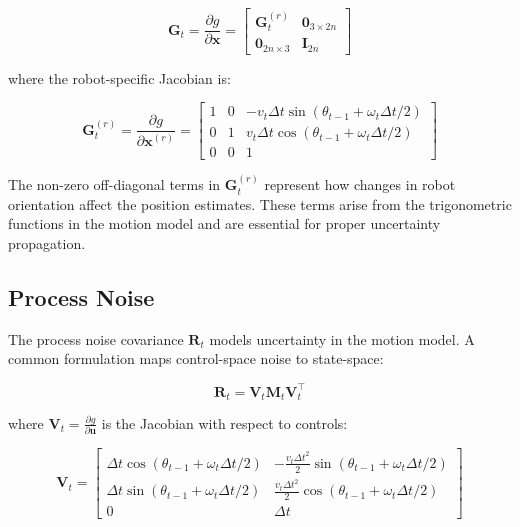 \documentclass[12pt,a4paper]{article}
\newcommand{\state}{\bm{x}}
\newcommand{\control}{\bm{u}}
\begin{document}
\begin{equation}
    \bm{G}_t = \frac{\partial g}{\partial \state} = \begin{bmatrix}
        \bm{G}_t^{(r)} & \bm{0}_{3 \times 2n} \\
        \bm{0}_{2n \times 3} & \bm{I}_{2n}
    \end{bmatrix}
\end{equation}

where the robot-specific Jacobian is:

\begin{equation}
    \bm{G}_t^{(r)} = \frac{\partial g}{\partial \state^{(r)}} = \begin{bmatrix}
        1 & 0 & -v_t \Delta t \sin(\theta_{t-1} + \omega_t \Delta t / 2) \\
        0 & 1 & v_t \Delta t \cos(\theta_{t-1} + \omega_t \Delta t / 2) \\
        0 & 0 & 1
    \end{bmatrix}
    \label{eq:motion_jacobian}
\end{equation}

The non-zero off-diagonal terms in $\bm{G}_t^{(r)}$ represent how changes in robot orientation affect the position estimates. These terms arise from the trigonometric functions in the motion model and are essential for proper uncertainty propagation.

\subsection{Process Noise}

The process noise covariance $\bm{R}_t$ models uncertainty in the motion model. A common formulation maps control-space noise to state-space:

\begin{equation}
    \bm{R}_t = \bm{V}_t \bm{M}_t \bm{V}_t^\top
\end{equation}

where $\bm{V}_t = \frac{\partial g}{\partial \control}$ is the Jacobian with respect to controls:

\begin{equation}
    \bm{V}_t = \begin{bmatrix}
        \Delta t \cos(\theta_{t-1} + \omega_t \Delta t / 2) & -\frac{v_t \Delta t^2}{2} \sin(\theta_{t-1} + \omega_t \Delta t / 2) \\
        \Delta t \sin(\theta_{t-1} + \omega_t \Delta t / 2) & \frac{v_t \Delta t^2}{2} \cos(\theta_{t-1} + \omega_t \Delta t / 2) \\
        0 & \Delta t
    \end{bmatrix}
\end{equation}
\end{document}
